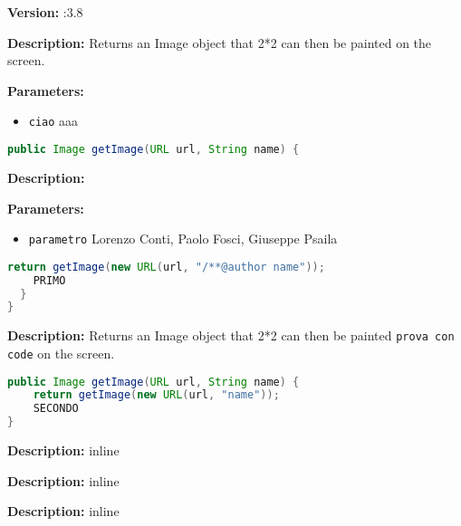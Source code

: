 \textbf{Version:} :3.8 

\textbf{Description:}
 Returns an Image object that 2*2 can then be painted on the screen. 

\textbf{Parameters:}
\begin{itemize}
  \item\texttt{ciao} aaa
\end{itemize}

\begin{lstlisting}[language=Java]
public Image getImage(URL url, String name) {
\end{lstlisting}
\textbf{Description:}
 

\textbf{Parameters:}
\begin{itemize}
  \item\texttt{parametro} Lorenzo Conti, Paolo Fosci, Giuseppe Psaila
\end{itemize}

\begin{lstlisting}[language=Java]
    return getImage(new URL(url, "/**@author name"));
    PRIMO
  }
}
\end{lstlisting}
\textbf{Description:}
Returns an Image object that 2*2 can then be painted \texttt{prova con code} on the screen.

\begin{lstlisting}[language=Java]
public Image getImage(URL url, String name) {
    return getImage(new URL(url, "name"));
    SECONDO
}
\end{lstlisting}
\textbf{Description:}
inline

\textbf{Description:}
inline

\textbf{Description:}
 inline 

